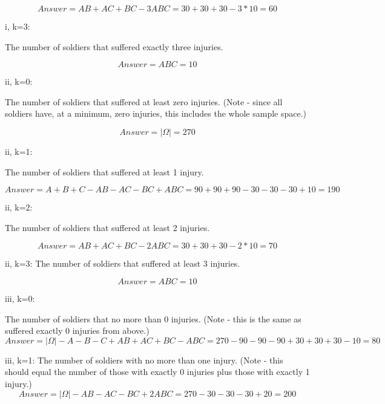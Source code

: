 \documentclass[11pt]{article}
\begin{document}
\[
Answer = AB + AC + BC - 3ABC = 30 + 30 + 30 - 3*10 = 60
\]

\vspace{1em}

i, k=3:

The number of soldiers that suffered exactly three injuries.

\[
Answer = ABC = 10
\]

\vspace{1em}


ii, k=0:

The number of soldiers that suffered at least zero injuries.
(Note - since all soldiers have, at a minimum, zero injuries, this includes the whole sample space.)

\[
Answer = \left|\Omega\right| = 270
\]

\vspace{1em}


ii, k=1:

The number of soldiers that suffered at least 1 injury.

\[
Answer = A + B + C - AB - AC - BC + ABC = 90 + 90 + 90 - 30 - 30 - 30 + 10 = 190 
\]

\vspace{1em}


ii, k=2: 

The number of soldiers that suffered at least 2 injuries.

\[
Answer = AB + AC + BC - 2 ABC = 30 + 30 + 30 - 2*10 = 70
\]

\vspace{1em}


ii, k=3:
The number of soldiers that suffered at least 3 injuries.

\[
Answer = ABC = 10
\]

\vspace{1em}


iii, k=0:

The number of soldiers that no more than 0 injuries.
(Note - this is the same as suffered exactly 0 injuries from above.)
\[
Answer = \left|\Omega\right| - A - B - C + AB + AC + BC - ABC = 270 - 90 - 90 - 90 + 30 + 30 + 30 - 10 = 80
\]

\vspace{1em}


iii, k=1:
The number of soldiers with no more than one injury.
(Note - this should equal the number of those with exactly 0 injuries plus those with exactly 1 injury.)
\[
Answer = \left|\Omega\right| - AB - AC - BC + 2ABC = 270 - 30 - 30 - 30 + 20 = 200
\]
\end{document}

